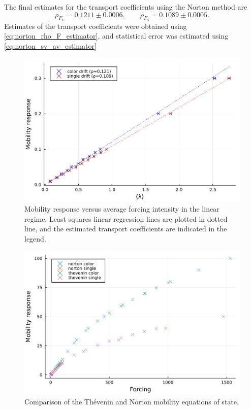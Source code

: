 The final estimates for the transport coefficients using the Norton method are 
\[\rho_{F_{\mathrm{C}}} = 0.1211 \pm 0.0006,\qquad \rho_{F_{\mathrm{S}}}=0.1089\pm0.0005.\]
Estimates of the transport coefficients were obtained using \eqref{eq:norton_rho_F_estimator}, and statistical error was estimated using \eqref{eq:norton_sv_av_estimator}

\begin{figure}[htbp]
    \begin{center}
      \includegraphics[width=0.9\linewidth]{figures/norton_mobility_plot.pdf}
      \caption{ \label{fig:norton_mobility_linear}
        Mobility response versus average forcing intensity in the linear regime. Least squares linear regression lines are plotted in dotted line, and the estimated transport coefficients are indicated in the legend.
      }
    \end{center}
  \end{figure}

  \begin{figure}[htbp]
    \begin{center}
      \includegraphics[width=0.7\linewidth]{figures/norton_mobility_full.pdf}
      \caption{ \label{fig:norton_mobility_full}
        Comparison of the Thévenin and Norton mobility equations of state.
      }
    \end{center}
  \end{figure}

